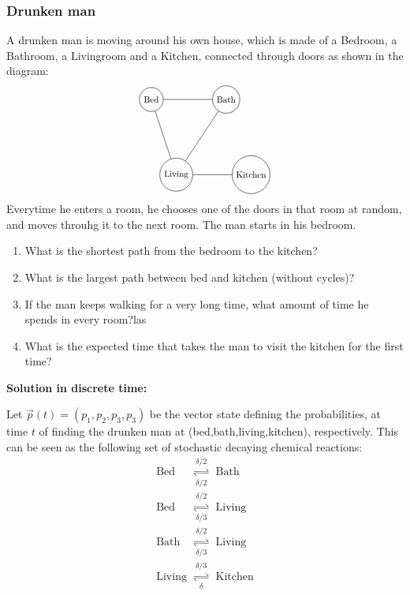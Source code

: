 \subsubsection*{\bf Drunken man}

A drunken man is moving around his own house, which is made of a Bedroom, a Bathroom, a Livingroom and a Kitchen, connected through doors as shown in the diagram:
\[
\begin{tikzpicture}[scale=0.8, transform shape]
    \node[shape=circle,draw=black] (1) at (0,3) {Bed};
    \node[shape=circle,draw=black] (2) at (3,3) {Bath};
    \node[shape=circle,draw=black] (3) at (1,0) {Living};
    \node[shape=circle,draw=black] (4) at (4,0) {Kitchen};
    \draw[-] (1) -- (2);
    \draw[-] (1) -- (3);
    \draw[-] (2) -- (3);
    \draw[-] (3) -- (4);
\end{tikzpicture} 
\]
Everytime he enters a room, he chooses one of the doors in that room at random, and moves throuhg it to the next room. The man starts in his bedroom.

\begin{enumerate}
 \item What is the shortest path from the bedroom to the kitchen?
 \item What is the largest path between bed and kitchen (without cycles)?
 \item If the man keeps walking for a very long time, what amount of time he spends in every room?las
 \item What is the expected time that takes the man to visit the kitchen for the first time?
\end{enumerate}

{\bf Solution in discrete time:}

Let $\vec p(t) = (p_1,p_2,p_3,p_3)$ be the vector state defining the probabilities, at time $t$ of finding the drunken man at (bed,bath,living,kitchen), respectively. This can be seen as the following set of stochastic decaying chemical reactions:
\begin{eqnarray*}
 \mbox{Bed}  &\mathrel{\mathop{\rightleftharpoons}\limits^{\delta/2}_{\delta/2}}& \mbox{Bath} \\
  \mbox{Bed}  &\mathrel{\mathop{\rightleftharpoons}\limits^{\delta/2}_{\delta/3}}& \mbox{Living} \\
  \mbox{Bath}  &\mathrel{\mathop{\rightleftharpoons}\limits^{\delta/2}_{\delta/3}}& \mbox{Living} \\
  \mbox{Living}  &\mathrel{\mathop{\rightleftharpoons}\limits^{\delta/3}_{\delta}}& \mbox{Kitchen} 
\end{eqnarray*}


